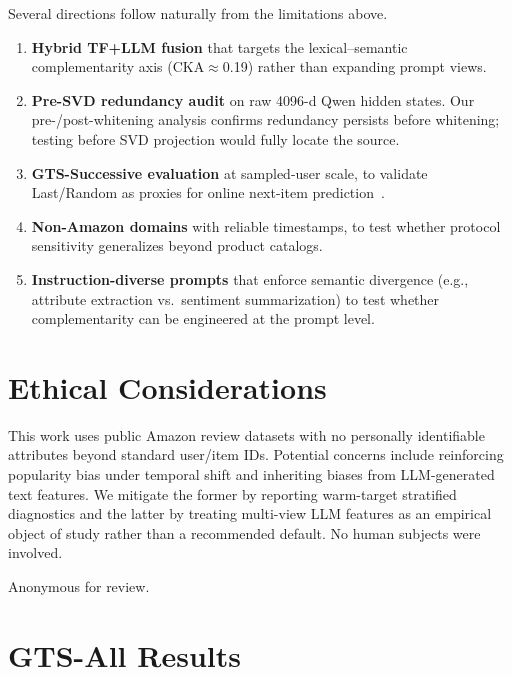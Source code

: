 \documentclass[sigconf,natbib=true,anonymous]{acmart}
\begin{document}
Several directions follow naturally from the limitations above.
\begin{enumerate}[leftmargin=*,itemsep=1pt]
\item \textbf{Hybrid TF+LLM fusion} that targets the lexical--semantic complementarity axis (CKA$\approx$0.19) rather than expanding prompt views.
\item \textbf{Pre-SVD redundancy audit} on raw 4096-d Qwen hidden states.  Our pre-/post-whitening analysis confirms redundancy persists before whitening; testing before SVD projection would fully locate the source.
\item \textbf{GTS-Successive evaluation} at sampled-user scale, to validate Last/Random as proxies for online next-item prediction~\cite{liang2024timetosplit}.
\item \textbf{Non-Amazon domains} with reliable timestamps, to test whether protocol sensitivity generalizes beyond product catalogs.
\item \textbf{Instruction-diverse prompts} that enforce semantic divergence (e.g., attribute extraction vs.\ sentiment summarization) to test whether complementarity can be engineered at the prompt level.
\end{enumerate}

\section*{Ethical Considerations}
This work uses public Amazon review datasets with no personally identifiable attributes beyond standard user/item IDs.
Potential concerns include reinforcing popularity bias under temporal shift and inheriting biases from LLM-generated text features.
We mitigate the former by reporting warm-target stratified diagnostics and the latter by treating multi-view LLM features as an empirical object of study rather than a recommended default.
No human subjects were involved.

\begin{acks}
Anonymous for review.
\end{acks}




\appendix

\section{GTS-All Results}
\label{app:gts-all}
\end{document}
